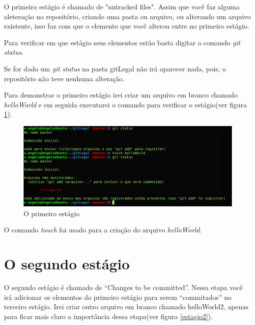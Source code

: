 \documentclass[12pt,openright,oneside,a4paper,english,brazil]{abntex2}
\begin{document}
O primeiro estágio é chamado de "untracked files". Assim que você faz alguma aleteração no repositório, criando uma pasta ou arquivo, ou alterando um arquivo existente, isso faz com que o elemento que você alterou entre no primeiro estágio.

Para verificar em que estágio seus elementos estão basta digitar o comando \textit{git status}.

Se for dado um \textit{git status} na pasta gitLegal não irá aparecer nada, pois, o repositório não teve nenhuma alteração. 

Para demonstrar o primeiro estágio irei criar um arquivo em branco chamado \textit{helloWorld} e em seguida executarei o comando para verificar o estágio(ver figura \ref{estagio1}).

\begin{figure}[h]
	\caption{\label{estagio1}O primeiro estágio}
	\begin{center}
		\includegraphics[width=1\linewidth]{imagens/estagio1}
	\end{center}
\end{figure}

O comando \textit{touch} foi usado para a criação do arquivo \textit{helloWorld}.

\section{O segundo estágio}

O segundo estágio é chamado de ``Changes to be committed''. Nessa etapa você irá adicionar os elementos do primeiro estágio para serem ``commitados''  no terceiro estágio. Irei criar outro arquivo em branco chamado helloWorld2, apenas para ficar mais claro a importância dessa etapa(ver figura \ref{estagio2}).
\end{document}
